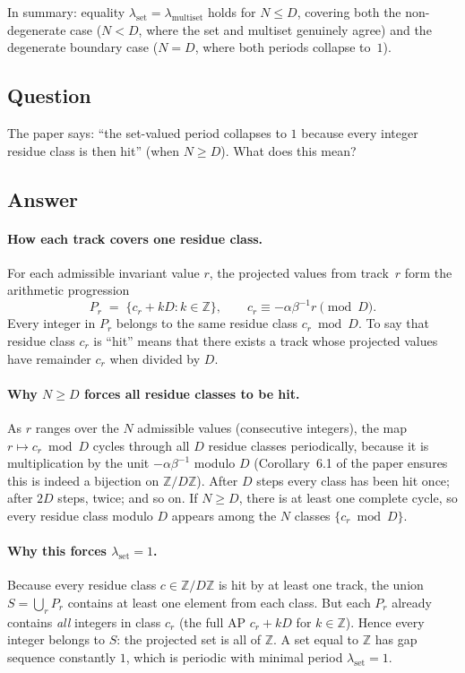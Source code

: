\documentclass{amsart}
\theoremstyle{definition}
\theoremstyle{plain}
\theoremstyle{remark}
\begin{document}
\medskip\noindent
In summary: equality \(\lambda_{\mathrm{set}} = \lambda_{\mathrm{multiset}}\)
holds for \(N \le D\), covering both the non-degenerate case (\(N < D\), where
the set and multiset genuinely agree) and the degenerate boundary case
(\(N = D\), where both periods collapse to~\(1\)).

\subsection*{Question}

The paper says: ``the set-valued period collapses to \(1\) because every
integer residue class is then hit'' (when \(N \ge D\)).  What does this mean?

\subsection*{Answer}

\paragraph{How each track covers one residue class.}
For each admissible invariant value \(r\), the projected values from track~\(r\)
form the arithmetic progression
\[
  P_r \;=\; \{c_r + kD : k \in \mathbb{Z}\},
  \qquad c_r \equiv -\alpha\beta^{-1}r \pmod{D}.
\]
Every integer in \(P_r\) belongs to the same residue class \(c_r \bmod D\).
To say that residue class \(c_r\) is ``hit'' means that there exists a track
whose projected values have remainder \(c_r\) when divided by \(D\).

\paragraph{Why \(N \ge D\) forces all residue classes to be hit.}
As \(r\) ranges over the \(N\) admissible values (consecutive integers), the
map \(r \mapsto c_r \bmod D\) cycles through all \(D\) residue classes
periodically, because it is multiplication by the unit \(-\alpha\beta^{-1}\)
modulo \(D\) (Corollary~6.1 of the paper ensures this is indeed a bijection on
\(\mathbb{Z}/D\mathbb{Z}\)).  After \(D\) steps every class has been hit once;
after \(2D\) steps, twice; and so on.  If \(N \ge D\), there is at least one
complete cycle, so every residue class modulo \(D\) appears among the \(N\)
classes \(\{c_r \bmod D\}\).

\paragraph{Why this forces \(\lambda_{\mathrm{set}} = 1\).}
Because every residue class \(c \in \mathbb{Z}/D\mathbb{Z}\) is hit by at
least one track, the union \(S = \bigcup_r P_r\) contains at least one element
from each class.  But each \(P_r\) already contains \emph{all} integers in
class \(c_r\) (the full AP \(c_r + kD\) for \(k\in\mathbb{Z}\)).  Hence every
integer belongs to \(S\): the projected set is all of \(\mathbb{Z}\).  A set
equal to \(\mathbb{Z}\) has gap sequence constantly \(1\), which is periodic
with minimal period \(\lambda_{\mathrm{set}} = 1\).
\end{document}
